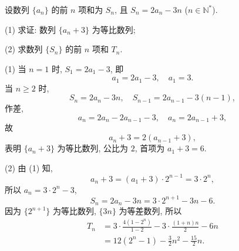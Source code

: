 \begin{exercise}
    设数列 $\{a_n\}$ 的前 $n$ 项和为 $S_n$, 且 $S_n=2a_n -3n$ ($n\in\mathbb{N}^*$).
    
    (1) 求证: 数列 $\{a_n +3\}$ 为等比数列;
    
    (2) 求数列 $\{S_n\}$ 的前 $n$ 项和 $T_n$.
\end{exercise}
\beginsolution
    (1) 当 $n=1$ 时, $S_1= 2a_1-3$, 即
    \[a_1= 2a_1-3,\quad a_1= 3.\]
    当 $n\geqslant 2$ 时, 
    \[S_n= 2a_n-3n,\quad S_{n-1}= 2a_{n-1}-3(n-1),\]
    作差,
    \[a_n= 2a_n- 2a_{n-1}- 3,\quad
        a_n= 2a_{n-1}+3,\]
    故 
    \[a_{n}+ 3= 2(a_{n-1}+3),\]
    表明 $\{a_n+3\}$ 为等比数列, 公比为 $2$, 首项为 $a_1+3= 6$.

    (2) 由 (1) 知,
    \[a_n+3= (a_1+3)\cdot 2^{n-1}= 3\cdot 2^n,\]
    所以 $a_n= 3\cdot 2^n-3$,
    \[S_n= 2a_n-3n= 3\cdot 2^{n+1}- 3n-6.\]
    因为 $\{2^{n+1}\}$ 为等比数列, $\{3n\}$ 为等差数列, 所以
    \[\begin{aligned}
        T_n&= 3\cdot\frac{4(1-2^n)}{1-2}
            - 3\cdot\frac{(1+n)n}{2}- 6n\\
        &= 12(2^n-1)- \frac32n^2- \frac{15}2n.
    \end{aligned}\]
\endsolution
